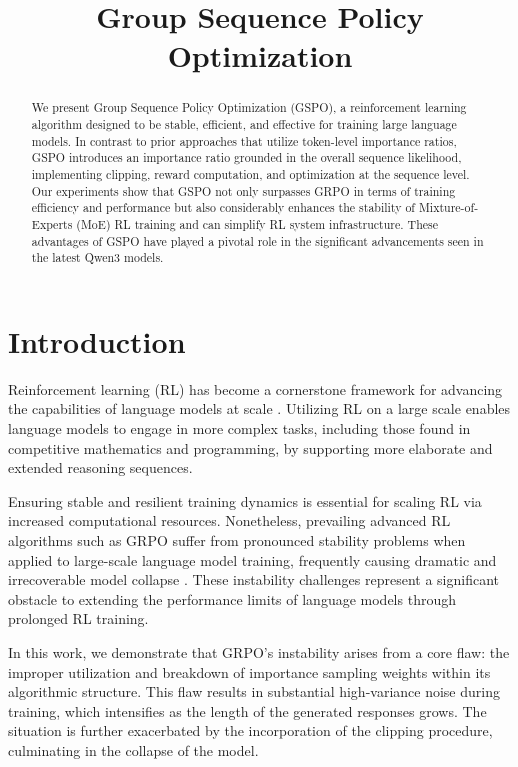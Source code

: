 \title{Group Sequence Policy Optimization}

\begin{abstract}
We present Group Sequence Policy Optimization (GSPO), a reinforcement learning algorithm designed to be stable, efficient, and effective for training large language models. In contrast to prior approaches that utilize token-level importance ratios, GSPO introduces an importance ratio grounded in the overall sequence likelihood, implementing clipping, reward computation, and optimization at the sequence level. Our experiments show that GSPO not only surpasses GRPO in terms of training efficiency and performance but also considerably enhances the stability of Mixture-of-Experts (MoE) RL training and can simplify RL system infrastructure. These advantages of GSPO have played a pivotal role in the significant advancements seen in the latest Qwen3 models.
\end{abstract}

\section{Introduction}
\label{sec:intro}

Reinforcement learning (RL) has become a cornerstone framework for advancing the capabilities of language models at scale \citep{o1,dpsk-r1,qwq32b,qwen3}. Utilizing RL on a large scale enables language models to engage in more complex tasks, including those found in competitive mathematics and programming, by supporting more elaborate and extended reasoning sequences.

Ensuring stable and resilient training dynamics is essential for scaling RL via increased computational resources. Nonetheless, prevailing advanced RL algorithms such as GRPO \citep{grpo} suffer from pronounced stability problems when applied to large-scale language model training, frequently causing dramatic and irrecoverable model collapse \citep{qwen3, minimax-m1}. These instability challenges represent a significant obstacle to extending the performance limits of language models through prolonged RL training.

In this work, we demonstrate that GRPO's instability arises from a core flaw: the improper utilization and breakdown of importance sampling weights within its algorithmic structure. This flaw results in substantial high-variance noise during training, which intensifies as the length of the generated responses grows. The situation is further exacerbated by the incorporation of the clipping procedure, culminating in the collapse of the model.

